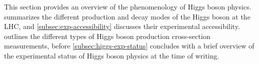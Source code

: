 This section provides an overview of the phenomenology of Higgs boson physics.  summarizes the different production and decay modes of the Higgs boson at the LHC, and \cref{subsec:exp-accessibility} discusses their experimental accessibility.  outlines the different types of Higgs boson production cross-section measurements, before \cref{subsec:higgs-exp-status} concludes with a brief overview of the experimental status of Higgs boson physics at the time of writing.





